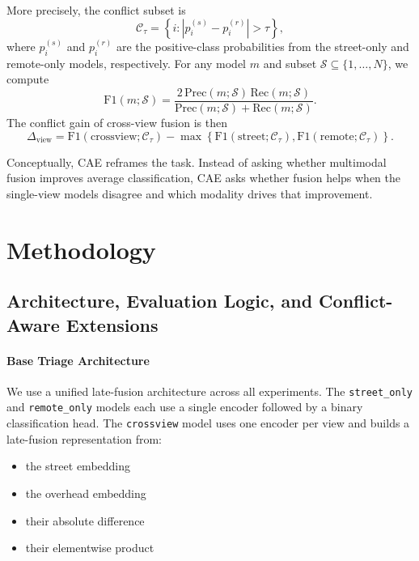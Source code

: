\documentclass[sigconf]{acmart}
\newcommand{\conf}{\mathcal{C}_{\tau}}
\begin{document}
More precisely, the conflict subset is
\begin{equation}
\conf=\left\{i:\left|p_i^{(s)}-p_i^{(r)}\right|>\tau\right\},
\label{eq:conflictset}
\end{equation}
where $p_i^{(s)}$ and $p_i^{(r)}$ are the positive-class probabilities from
the street-only and remote-only models, respectively. For any model $m$ and
subset $\mathcal{S}\subseteq\{1,\dots,N\}$, we compute
\begin{equation}
\mathrm{F1}(m;\mathcal{S})=
\frac{2\,\mathrm{Prec}(m;\mathcal{S})\,\mathrm{Rec}(m;\mathcal{S})}
{\mathrm{Prec}(m;\mathcal{S})+\mathrm{Rec}(m;\mathcal{S})}.
\label{eq:f1}
\end{equation}
The conflict gain of cross-view fusion is then
\begin{equation}
\Delta_{\mathrm{view}}=
\mathrm{F1}(\mathrm{crossview};\conf)
-\max\left\{
\mathrm{F1}(\mathrm{street};\conf),
\mathrm{F1}(\mathrm{remote};\conf)
\right\}.
\label{eq:deltaview}
\end{equation}

Conceptually, CAE reframes the task. Instead of asking whether multimodal
fusion improves average classification, CAE asks whether fusion helps when the
single-view models disagree and which modality drives that improvement.


\section{Methodology}

\subsection{Architecture, Evaluation Logic, and Conflict-Aware Extensions}

\paragraph{Base Triage Architecture}

We use a unified late-fusion architecture across all experiments. The
\texttt{street\_only} and \texttt{remote\_only} models each use a single
encoder followed by a binary classification head. The \texttt{crossview} model
uses one encoder per view and builds a late-fusion representation from:
\begin{itemize}
  \item the street embedding
  \item the overhead embedding
  \item their absolute difference
  \item their elementwise product
\end{itemize}
\end{document}
